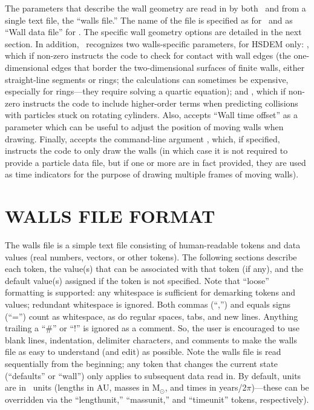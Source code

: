 The parameters that describe the wall geometry are read in by both
\pkd\ and  from a single text file, the ``walls file.''
The name of the file is specified as  for \pkd\ and
as ``Wall data file'' for .  The specific wall geometry
options are detailed in the next section.  In addition,
\pkd\ recognizes two walls-specific parameters, for HSDEM only:
, which if non-zero instructs the code to check
for contact with wall edges (\ie the one-dimensional edges that border
the two-dimensional surfaces of finite walls, \viz either
straight-line segments or rings; the calculations can sometimes be
expensive, especially for rings---they require solving a quartic
equation); and , which if non-zero instructs
the code to include higher-order terms when predicting collisions with
particles stuck on rotating cylinders.  Also,  accepts
``Wall time offset'' as a parameter which can be useful to adjust the
position of moving walls when drawing.  Finally,  accepts
the command-line argument , which, if specified, instructs
the code to only draw the walls (in which case it is not required to
provide a particle data file, but if one or more are in fact provided,
they are used as time indicators for the purpose of drawing multiple
frames of moving walls).

\section{WALLS FILE FORMAT}

The walls file is a simple text file consisting of human-readable
tokens and data values (real numbers, vectors, or other tokens).  The
following sections describe each token, the value(s) that can be
associated with that token (if any), and the default value(s) assigned
if the token is not specified.  Note that ``loose'' formatting is
supported: any whitespace is sufficient for demarking tokens and
values; redundant whitespace is ignored.  Both commas (``,'') and
equals signs (``='') count as whitespace, as do regular spaces, tabs,
and new lines.  Anything trailing a ``\#'' or ``!'' is ignored as a
comment.  So, the user is encouraged to use blank lines, indentation,
delimiter characters, and comments to make the walls file as easy to
understand (and edit) as possible.  Note the walls file is read
sequentially from the beginning; any token that changes the current
state (\ie ``defaults'' or ``wall'') only applies to subsequent data
read in.  By default, units are in \pkd\ units (\ie lengths in AU,
masses in M$_\odot$, and times in years/2$\pi$)---these can be
overridden via the ``lengthunit,'' ``massunit,'' and ``timeunit''
tokens, respectively).

